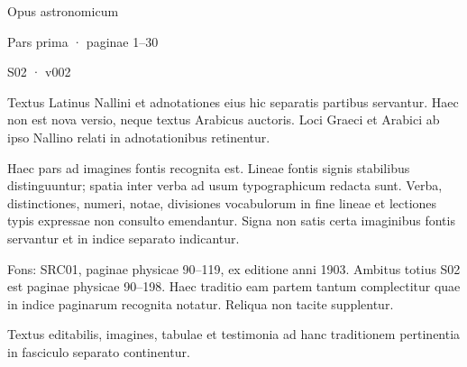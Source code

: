 \documentclass[11pt]{article}
\begin{document}
\vspace*{24mm}\begin{center}
{\fontsize{24}{31}\selectfont Opus astronomicum\par}
\vspace{14mm}Pars prima · paginae 1–30\par
S02 · v002
\end{center}\vspace{13mm}
\fontsize{11}{16}\selectfont
Textus Latinus Nallini et adnotationes eius hic separatis partibus servantur.
Haec non est nova versio, neque textus Arabicus auctoris. Loci Graeci et Arabici ab ipso
Nallino relati in adnotationibus retinentur.\par\medskip
Haec pars ad imagines fontis recognita est. Lineae fontis signis stabilibus distinguuntur;
spatia inter verba ad usum typographicum redacta sunt. Verba, distinctiones, numeri,
notae, divisiones vocabulorum in fine lineae et lectiones typis expressae non consulto
emendantur. Signa non satis certa imaginibus fontis servantur et in indice separato
indicantur.\par\medskip
Fons: SRC01, paginae physicae 90–119, ex editione anni 1903.
Ambitus totius S02 est paginae physicae 90–198. Haec traditio eam partem tantum
complectitur quae in indice paginarum recognita notatur. Reliqua non tacite supplentur.\par\medskip
Textus editabilis, imagines, tabulae et testimonia ad hanc traditionem pertinentia
in fasciculo separato continentur.
\end{document}
